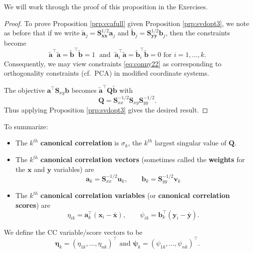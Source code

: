 \documentclass[]{book}
\theoremstyle{definition}
\theoremstyle{definition}
\theoremstyle{definition}
\theoremstyle{remark}
\begin{document}
We will work through the proof of this proposition in the Exercises.

\begin{proof}
{}To prove Proposition \ref{prp:ccafull} given Proposition \ref{prp:svdopt3}, we note as before that if we write \(\tilde{\boldsymbol a}_j =\boldsymbol S_{\boldsymbol x\boldsymbol x}^{1/2} \boldsymbol a_j\) and \(\tilde{\boldsymbol b}_j=\boldsymbol S_{\boldsymbol y\boldsymbol y}^{1/2} \boldsymbol b_j\), then the constraints become
\[\tilde{\boldsymbol a}^\top \tilde{\boldsymbol a}=\tilde{\boldsymbol b}^\top\tilde{ \boldsymbol b}=1 \;\mbox{ and }\;\tilde{\boldsymbol a}_i^\top \tilde{\boldsymbol a}=\tilde{\boldsymbol b}_i^\top \tilde{\boldsymbol b} = 0 \mbox{ for }i=1, \ldots, k.
\]
Consequently, we may view constraints \eqref{eq:conny22} as corresponding to orthogonality constraints (cf.~PCA) in modified coordinate systems.

The objective \(\boldsymbol a^\top \boldsymbol S_{xy}\boldsymbol b\) becomes
\(\tilde{\boldsymbol a}^\top \boldsymbol Q\tilde{\boldsymbol b}\)
with
\[\boldsymbol Q= \boldsymbol S_{xx}^{-1/2} \boldsymbol S_{xy}\boldsymbol S_{yy}^{-1/2}.\]
Thus applying Proposition \ref{prp:svdopt3} gives the desired result.
\end{proof}

To summarize:

\begin{itemize}
\item
  The \(k^{th}\) \textbf{canonical correlation} is \(\sigma_k\), the \(k^{th}\) largest singular value of \(\boldsymbol Q\).
\item
  The \(k^{th}\) \textbf{canonical correlation vectors} (sometimes called the \textbf{weights} for the \(\boldsymbol x\) and \(\boldsymbol y\) variables) are \[\boldsymbol a_k = \boldsymbol S_{xx}^{-1/2} \boldsymbol u_k, \qquad \boldsymbol b_k = \boldsymbol S_{yy}^{-1/2} \boldsymbol v_k\]
\item
  The \(k^{th}\) \textbf{canonical correlation variables} (or \textbf{canonical correlation scores}) are
  \[\eta_{ik} = \boldsymbol a_k^\top (\boldsymbol x_i-\bar{\boldsymbol x}), \qquad \psi_{ik} = \boldsymbol b_k^\top (\boldsymbol y_i-\bar{\boldsymbol y}).\]
\end{itemize}

We define the CC variable/score vectors to be
\[{\pmb \eta}_k=(\eta_{1k}, \ldots , \eta_{nk})^\top \mbox{ and }{\pmb \psi}_{k}=(\psi_{1k}, \ldots , \psi_{nk})^\top.\]
\end{document}
